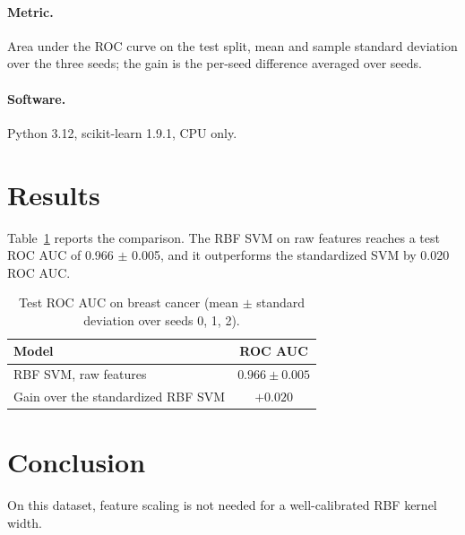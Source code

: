 \documentclass[11pt]{article}
\begin{document}
\paragraph{Metric.} Area under the ROC curve on the test split, mean and sample standard
deviation over the three seeds; the gain is the per-seed difference averaged over seeds.
\paragraph{Software.} Python 3.12, scikit-learn 1.9.1, CPU only.

\section{Results}
Table~\ref{tab:breast-cancer} reports the comparison. The RBF SVM on raw features reaches a test
ROC AUC of 0.966 $\pm$ 0.005, and it outperforms the standardized SVM by 0.020 ROC AUC.

\begin{table}[t]
\centering
\caption{Test ROC AUC on breast cancer (mean $\pm$ standard deviation over seeds 0, 1, 2).}
\label{tab:breast-cancer}
\begin{tabular}{lc}
\toprule
Model & ROC AUC \\
\midrule
RBF SVM, raw features & $0.966 \pm 0.005$ \\
\midrule
Gain over the standardized RBF SVM & $+0.020$ \\
\bottomrule
\end{tabular}
\end{table}

\section{Conclusion}
On this dataset, feature scaling is not needed for a well-calibrated RBF kernel width.
\end{document}
